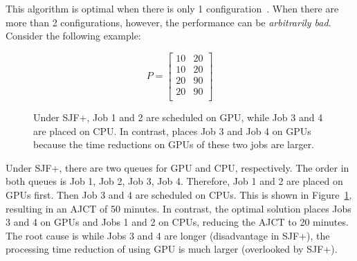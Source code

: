 This algorithm is optimal when there is only 1 configuration~\cite{cobham1954priority}. 
When there are more than 2 configurations, however, the performance can be \emph{arbitrarily bad}. Consider the following example:

$$
P = \begin{bmatrix}
10 & 20\\
10 & 20 \\
20 & 90\\
20 & 90\\
\end{bmatrix}
$$


\begin{figure}[h]
	\centering
	    \hspace{0.0in}
	    \hspace{0.0in}
	\caption{Under SJF+, Job 1 and 2 are scheduled on GPU, while Job 3 and 4 are placed on CPU. In contrast, \name places Job 3 and Job 4 on GPUs because the time reductions on GPUs of these two jobs are larger.}
	\label{fig:SJF}
\end{figure}


Under SJF+, there are two queues for GPU and CPU, respectively. The order in both queues is Job 1, Job 2, Job 3, Job 4. Therefore, Job 1 and 2 are placed on GPUs first. Then Job 3 and 4 are scheduled on CPUs. This is shown in Figure~\ref{fig:SJF}, resulting in an AJCT of 50 minutes. 
In contrast, the optimal solution places Jobs 3 and 4 on GPUs and Jobs 1 and 2 on CPUs, reducing the AJCT to 20 minutes. 
The root cause is while Jobs 3 and 4 are longer (disadvantage in SJF+), the processing time reduction of using GPU is much larger (overlooked by SJF+).


